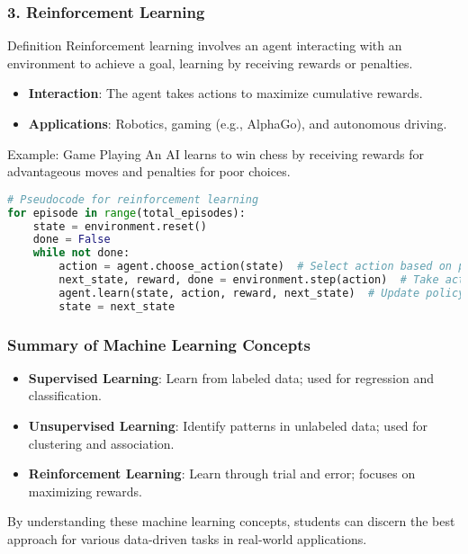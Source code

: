 \documentclass[aspectratio=169]{beamer}
\begin{document}
\begin{frame}[fragile]
    \frametitle{3. Reinforcement Learning}
    
    \begin{block}{Definition}
        Reinforcement learning involves an agent interacting with an environment to achieve a goal, learning by receiving rewards or penalties.
    \end{block}

    \begin{itemize}
        \item \textbf{Interaction}: The agent takes actions to maximize cumulative rewards.
        \item \textbf{Applications}: Robotics, gaming (e.g., AlphaGo), and autonomous driving.
    \end{itemize}

    \begin{block}{Example: Game Playing}
        An AI learns to win chess by receiving rewards for advantageous moves and penalties for poor choices.
    \end{block}

    \begin{lstlisting}[language=Python, caption={Pseudocode for Reinforcement Learning}]
# Pseudocode for reinforcement learning
for episode in range(total_episodes):
    state = environment.reset()
    done = False
    while not done:
        action = agent.choose_action(state)  # Select action based on policy
        next_state, reward, done = environment.step(action)  # Take action
        agent.learn(state, action, reward, next_state)  # Update policy
        state = next_state
    \end{lstlisting}
\end{frame}

\begin{frame}[fragile]
    \frametitle{Summary of Machine Learning Concepts}
    
    \begin{itemize}
        \item \textbf{Supervised Learning}: Learn from labeled data; used for regression and classification.
        \item \textbf{Unsupervised Learning}: Identify patterns in unlabeled data; used for clustering and association.
        \item \textbf{Reinforcement Learning}: Learn through trial and error; focuses on maximizing rewards.
    \end{itemize}

    By understanding these machine learning concepts, students can discern the best approach for various data-driven tasks in real-world applications.
\end{frame}
\end{document}

